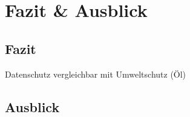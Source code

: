 \section{Fazit \& Ausblick}

\subsection{Fazit}

Datenschutz vergleichbar mit Umweltschutz (Öl)

\subsection{Ausblick}


